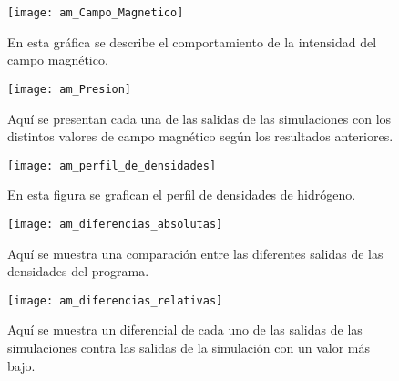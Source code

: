 \newpage
\begin{figure}[h]
\centering
\texttt{[image: am\_Campo\_Magnetico]}
\caption{ En esta gr\'afica se describe el comportamiento de la intensidad del campo magn\'etico. }
\label{am_Campo_Magnetico}
\end{figure}


\begin{figure}[h]
\centering
\texttt{[image: am\_Presion]}
\caption{ Aqu\'i se presentan cada una de las salidas de las simulaciones con los distintos valores de campo magn\'etico seg\'un los resultados anteriores.}
\label{am_Presion}
\end{figure}

\begin{figure}[h]
\centering
\texttt{[image: am\_perfil\_de\_densidades]}
\caption{ En esta figura se grafican el perfil de densidades de hidr\'ogeno.}
\label{am_perfil_de_densidades}
\end{figure}

\begin{figure}[h]
\centering
\texttt{[image: am\_diferencias\_absolutas]}
\caption{ Aqu\'i se muestra una comparaci\'on entre las diferentes salidas de las densidades del programa.}
\label{am_diferencias_absolutas}
\end{figure}

\begin{figure}[h]
\centering
\texttt{[image: am\_diferencias\_relativas]}
\caption{ Aqu\'i se muestra un diferencial de cada uno de las salidas de las simulaciones contra las salidas de la simulaci\'on con un valor m\'as bajo.}
\label{am_diferencias_relativas}
\end{figure}
